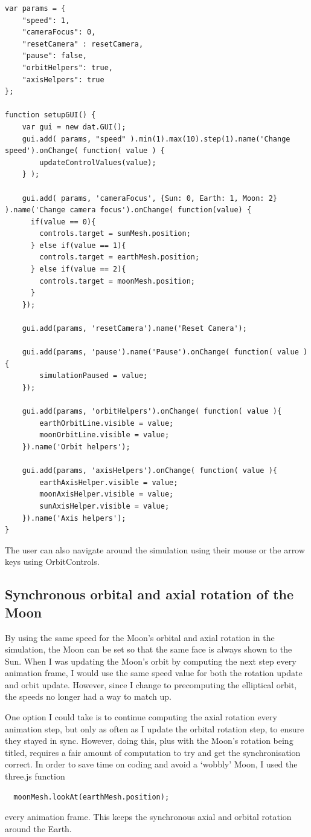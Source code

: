 \documentclass[12pt]{article}
\begin{document}
\begin{lstlisting}
var params = {
    "speed": 1,
    "cameraFocus": 0,
    "resetCamera" : resetCamera,
    "pause": false,
    "orbitHelpers": true,
    "axisHelpers": true
};

function setupGUI() {
    var gui = new dat.GUI();
    gui.add( params, "speed" ).min(1).max(10).step(1).name('Change speed').onChange( function( value ) {
        updateControlValues(value);
    } );

    gui.add( params, 'cameraFocus', {Sun: 0, Earth: 1, Moon: 2} ).name('Change camera focus').onChange( function(value) {
      if(value == 0){
        controls.target = sunMesh.position;
      } else if(value == 1){
        controls.target = earthMesh.position;
      } else if(value == 2){
        controls.target = moonMesh.position;
      }
    });

    gui.add(params, 'resetCamera').name('Reset Camera');

    gui.add(params, 'pause').name('Pause').onChange( function( value ){
        simulationPaused = value;
    });
    
    gui.add(params, 'orbitHelpers').onChange( function( value ){
        earthOrbitLine.visible = value;
        moonOrbitLine.visible = value;
    }).name('Orbit helpers');

    gui.add(params, 'axisHelpers').onChange( function( value ){
        earthAxisHelper.visible = value;
        moonAxisHelper.visible = value;
        sunAxisHelper.visible = value;
    }).name('Axis helpers');    
}
\end{lstlisting}

The user can also navigate around the simulation using their mouse or the arrow keys using OrbitControls\cite{orbitcontrols}.

\subsection{Synchronous orbital and axial rotation of the Moon}
By using the same speed for the Moon's orbital and axial rotation in the simulation, the Moon can be set so that the same face is always shown to the Sun. When I was updating the Moon's orbit by computing the next step every animation frame, I would use the same speed value for both the rotation update and orbit update. However, since I change to precomputing the elliptical orbit, the speeds no longer had a way to match up.

One option I could take is to continue computing the axial rotation every animation step, but only as often as I update the orbital rotation step, to ensure they stayed in sync. However, doing this, plus with the Moon's rotation being titled, requires a fair amount of computation to try and get the synchronisation correct. In order to save time on coding and avoid a `wobbly' Moon, I used the three.js function 
\begin{lstlisting}
  moonMesh.lookAt(earthMesh.position);\end{lstlisting}
 every animation frame. This keeps the synchronous axial and orbital rotation around the Earth.
 
\end{document}
